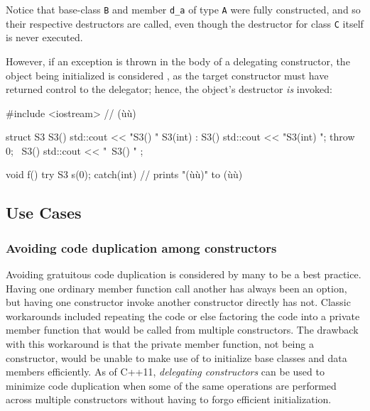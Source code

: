 \noindent Notice that base-class \lstinline!B! and member \lstinline!d_a! of type
\lstinline!A! were fully constructed, and so their respective destructors
are called, even though the destructor for class \lstinline!C! itself is
  never \mbox{executed}.

However, if an exception is thrown in the body of a delegating
constructor, the object being initialized is considered , as the target constructor must have returned control to
the delegator; hence, the object's destructor \emph{is} invoked:

\begin{emcppslisting}[language=C++]
#include <iostream>  // (ù{}ù)

struct S3
{
    S3()           { std::cout << "S3() "              }
    S3(int) : S3() { std::cout << "S3(int) "; throw 0; }
    ~S3()          { std::cout << "~S3() "             }
};

void f() try { S3 s(0); } catch(int) { }
    // prints "(ù{}ù)" to (ù{}ù)
\end{emcppslisting}


\subsection[Use Cases]{Use Cases}\label{ctordelegating-use-cases}

\subsubsection[Avoiding code duplication among constructors]{Avoiding code duplication among constructors}\label{avoiding-code-duplication-among-constructors}

Avoiding gratuitous code duplication is considered by many to be a best
practice. Having one ordinary member function call another has always
been an option, but having one constructor invoke another constructor
directly has not. Classic workarounds included repeating the code or
else factoring the code into a private member function that would be
called from multiple constructors. The drawback with this workaround is
that the private member function, not being a constructor, would be unable to
make use of  to initialize base classes and data members efficiently. As of C++11, \emph{delegating
constructors} can be used to minimize code duplication when some of
the same operations are performed across multiple constructors without
having to forgo efficient initialization.

